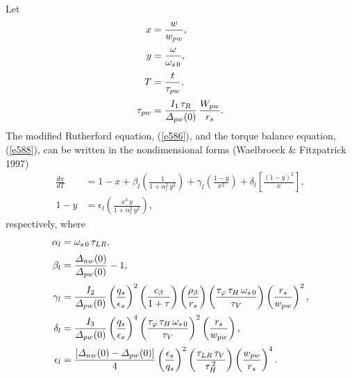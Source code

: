 \documentclass[notitlepage,12pt]{article}
\begin{document}
Let
\begin{align}
x &= \frac{w}{w_{pw}},\\[0.5ex]
y &= \frac{\omega}{\omega_{s\,0} },\\[0.5ex]
T &= \frac{t}{\tau_{pw}},\\[0.5ex]
\tau_{pw}&= \frac{I_1\,\tau_R}{{\mit\Delta}_{pw}(0)}\,\frac{W_{pw}}{r_s}.
\end{align}
The modified Rutherford equation, (\ref{e586}), and the torque balance equation, (\ref{e588}), can be
written in the nondimensional forms (Waelbroeck \& Fitzpatrick 1997)
\begin{align}\label{e594}
\frac{dx}{dT} &= 1 - x +\beta_l\left(\frac{1}{1+\alpha_l^2\,y^2}\right) + \gamma_l\left(\frac{1-y}{x^2}\right)
+\delta_l \left[\frac{(1-y)^2}{x}\right],\\[0.5ex]
1- y &= \epsilon_l\left(\frac{x^4\,y}{1+\alpha_l^2\,y^2}\right),\label{e595}
\end{align}
respectively, 
where
\begin{align}
\alpha_l & = \omega_{s\,0}\,\tau_{LR},\\[0.5ex]
\beta_l &= \frac{{\mit\Delta}_{nw}(0)}{{\mit\Delta}_{pw}(0)}-1,\\[0.5ex]
\gamma_l&= \frac{I_2}{{\mit\Delta}_{pw}(0)}\left(\frac{q_s}{\epsilon_s}\right)^2\left(\frac{c_\beta}{1+\tau}\right)
\left(\frac{\rho_\beta}{r_s}\right)\left(\frac{\tau_\varphi\,\tau_H\,\omega_{s\,0}}{\tau_V}\right)\left(\frac{r_s}{w_{pw}}\right)^2,\\[0.5ex]
\delta_l&= \frac{I_3}{{\mit\Delta}_{pw}(0)}\left(\frac{q_s}{\epsilon_s}\right)^4\left(\frac{\tau_\varphi\,\tau_H\,\omega_{s\,0}}{\tau_V}\right)^2\left(\frac{r_s}{w_{pw}}\right),\\[0.5ex]
\epsilon_l &= \frac{[{\mit\Delta}_{nw}(0)-{\mit\Delta}_{pw}(0)]}{4}\left(\frac{\epsilon_s}{q_s}\right)^2\left(\frac{\tau_{LR}\,\tau_V}{\tau_H^{\,2}}\right)\left(\frac{w_{pw}}{r_s}\right)^4.
\end{align}
\end{document}
